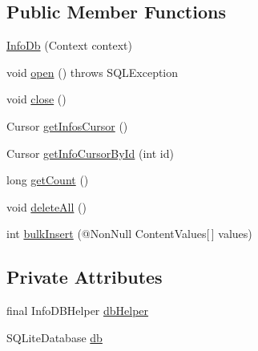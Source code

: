 \subsection*{Public Member Functions}
\begin{DoxyCompactItemize}
\item 
\hyperlink{classorg_1_1buildmlearn_1_1toolkit_1_1infotemplate_1_1data_1_1InfoDb_a5c77611262576b72820eb5b236513695}{Info\+Db} (Context context)
\item 
void \hyperlink{classorg_1_1buildmlearn_1_1toolkit_1_1infotemplate_1_1data_1_1InfoDb_a70b9284fc15f195b4c9d3432d371198a}{open} ()  throws S\+Q\+L\+Exception 
\item 
void \hyperlink{classorg_1_1buildmlearn_1_1toolkit_1_1infotemplate_1_1data_1_1InfoDb_a3d85d2c10aed33cc77b24f47efe41ed7}{close} ()
\item 
Cursor \hyperlink{classorg_1_1buildmlearn_1_1toolkit_1_1infotemplate_1_1data_1_1InfoDb_a8a11c7b13798bb99f2d9cfc7105cd472}{get\+Infos\+Cursor} ()
\item 
Cursor \hyperlink{classorg_1_1buildmlearn_1_1toolkit_1_1infotemplate_1_1data_1_1InfoDb_acd51fd8d201efd1d954fd3aa417997a1}{get\+Info\+Cursor\+By\+Id} (int id)
\item 
long \hyperlink{classorg_1_1buildmlearn_1_1toolkit_1_1infotemplate_1_1data_1_1InfoDb_a9ae6b2c376b451b3ac78c35fa95a4ac5}{get\+Count} ()
\item 
void \hyperlink{classorg_1_1buildmlearn_1_1toolkit_1_1infotemplate_1_1data_1_1InfoDb_a04bad5412d8ae83ac8192ae2d37c92b4}{delete\+All} ()
\item 
int \hyperlink{classorg_1_1buildmlearn_1_1toolkit_1_1infotemplate_1_1data_1_1InfoDb_a541c89df46e4d986a58cd59bafd0fe85}{bulk\+Insert} (@Non\+Null Content\+Values\mbox{[}$\,$\mbox{]} values)
\end{DoxyCompactItemize}
\subsection*{Private Attributes}
\begin{DoxyCompactItemize}
\item 
final Info\+D\+B\+Helper \hyperlink{classorg_1_1buildmlearn_1_1toolkit_1_1infotemplate_1_1data_1_1InfoDb_a34c9ce54812bfafd98df41278f6a96c8}{db\+Helper}
\item 
S\+Q\+Lite\+Database \hyperlink{classorg_1_1buildmlearn_1_1toolkit_1_1infotemplate_1_1data_1_1InfoDb_a2bd16780a42033d11e54fa27962fd41a}{db}
\end{DoxyCompactItemize}
